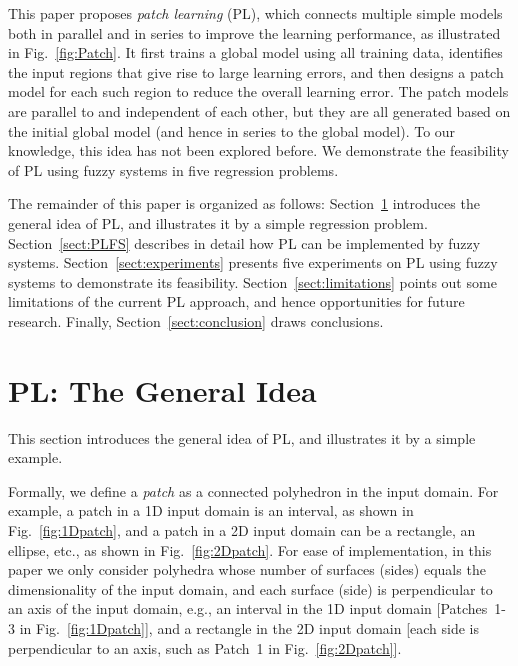 \documentclass[journal,twocolumn]{IEEEtran}
\begin{document}
This paper proposes \emph{patch learning} (PL), which connects multiple simple models both in parallel and in series to improve the learning performance, as illustrated in Fig.~\ref{fig:Patch}. It first trains a global model using all training data, identifies the input regions that give rise to large learning errors, and then designs a patch model for each such region to reduce the overall learning error. The patch models are parallel to and independent of each other, but they are all generated based on the initial global model (and hence in series to the global model). To our knowledge, this idea has not been explored before. We demonstrate the feasibility of PL using fuzzy systems in five regression problems.

The remainder of this paper is organized as follows: Section~\ref{sect:PL} introduces the general idea of PL, and illustrates it by a simple regression problem. Section~\ref{sect:PLFS} describes in detail how PL can be implemented by fuzzy systems. Section~\ref{sect:experiments} presents five experiments on PL using fuzzy systems to demonstrate its feasibility. Section~\ref{sect:limitations} points out some limitations of the current PL approach, and hence opportunities for future research. Finally, Section~\ref{sect:conclusion} draws conclusions.

\section{PL: The General Idea} \label{sect:PL}

This section introduces the general idea of PL, and illustrates it by a simple example.

Formally, we define a \emph{patch} as a connected polyhedron in the input domain. For example, a patch in a 1D input domain is an interval, as shown in Fig.~\ref{fig:1Dpatch}, and a patch in a 2D input domain can be a rectangle, an ellipse, etc., as shown in Fig.~\ref{fig:2Dpatch}. For ease of implementation, in this paper we only consider polyhedra whose number of surfaces (sides) equals the dimensionality of the input domain, and each surface (side) is perpendicular to an axis of the input domain, e.g., an interval in the 1D input domain [Patches~1-3 in Fig.~\ref{fig:1Dpatch}], and a rectangle in the 2D input domain [each side is perpendicular to an axis, such as Patch~1 in Fig.~\ref{fig:2Dpatch}].
\end{document}
